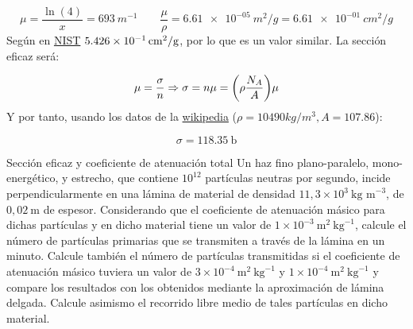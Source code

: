 \begin{equation}
    \mu = \frac{\ln (4)}{x} = 693\ \unit{m^{-1}} \qquad \frac{\mu}{\rho} = \SI{6.61e-05}{m^2/g} = \SI{6.61e-01}{cm^2/g}
\end{equation}
Según en \href{https://physics.nist.gov/cgi-bin/Xcom/xcom3_1}{NIST} $\SI{5.426E-01}{cm^2/g}$, por lo que es un valor similar. La sección eficaz será: 

\begin{equation}
    \mu = \frac{\sigma}{n} \Rightarrow \sigma = n \mu = \pqty{\rho \frac{N_A}{A}} \mu
\end{equation}
Y por tanto, usando los datos de la \href{https://es.wikipedia.org/wiki/Plata}{wikipedia} ($\rho=10490 \unit{kg/m^3}, A=107.86$):

\begin{equation}
    \sigma = \SI{118.35}{\barn}
\end{equation}


\begin{Ejercicio}{Sección eficaz y coeficiente de atenuación total} 
    Un haz fino plano-paralelo, mono-energético, y estrecho, que contiene $10^{12}$ partículas neutras por segundo, incide perpendicularmente en una lámina de material de densidad $11,3 \times 10^{3}\ \text{kg m}^{-3}$, de $0,02\ \text{m}$ de espesor. Considerando que el coeficiente de atenuación másico para dichas partículas y en dicho material tiene un valor de $1 \times 10^{-3}\ \text{m}^2 \ \text{kg}^{-1}$, calcule el número de partículas primarias que se transmiten a través de la lámina en un minuto. Calcule también el número de partículas transmitidas si el coeficiente de atenuación másico tuviera un valor de $3 \times 10^{-4}\ \text{m}^2 \ \text{kg}^{-1}$ y $1 \times 10^{-4}\ \text{m}^2 \ \text{kg}^{-1}$ y compare los resultados con los obtenidos mediante la aproximación de lámina delgada. Calcule asimismo el recorrido libre medio de tales partículas en dicho material.
\end{Ejercicio}





